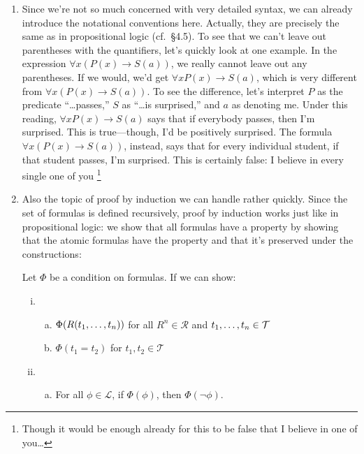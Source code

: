 \begin{enumerate}[\thesection.1]
	  \item Since we're not so much concerned with very detailed syntax, we can already introduce the notational conventions here.
			Actually, they are precisely the same as in propositional logic (cf.\ \S4.5).
			To see that we can't leave out parentheses with the quantifiers, let's quickly look at one example.
			In the expression $\forall x(P(x)\to S(a))$, we really cannot leave out any parentheses.
			If we would, we'd get $\forall xP(x)\to S(a)$, which is very different from $\forall x(P(x)\to S(a))$.
			To see the difference, let's interpret $P$ as the predicate ``\dots passes,'' $S$ as ``\dots is surprised,'' and $a$ as denoting me.
			Under this reading, $\forall xP(x)\to S(a)$ says that if everybody passes, then I'm surprised.
			This is true---though, I'd be positively surprised.
			The formula  $\forall x(P(x)\to S(a))$, instead, says that for every individual student, if that student passes, I'm surprised.
			This is certainly false: I believe in every single one of you \smiley \footnote{%
			Though it would be enough already for this to be false that I believe in one of you\dots}

		
		\item Also the topic of proof by induction we can handle rather quickly. Since the set of formulas is defined recursively, proof by induction works just like in propositional logic: we show that all formulas have a property by showing that the atomic formulas have the property and that it's preserved under the constructions:
		 \begin{theorem}
		Let $\Phi$ be a condition on formulas. If we can show:
		\begin{enumerate}[(i)]
		
			\item  \begin{enumerate}[(a)]
			
				\item $\Phi(R(t_1,\mathellipsis, t_n))$ for all $R^n\in \mathcal{R}$ and $t_1,\mathellipsis, t_n\in\mathcal{T}$
				
				\item $\Phi(t_1=t_2)$ for $t_1,t_2\in \mathcal{T}$
			
			\end{enumerate}
			
			\item \begin{enumerate}[(a)]
			
			\item For all $\phi\in\mathcal{L}$, if $\Phi(\phi)$, then $\Phi(\neg\phi)$.


\end{enumerate}
\end{enumerate}
\end{theorem}
\end{enumerate}
